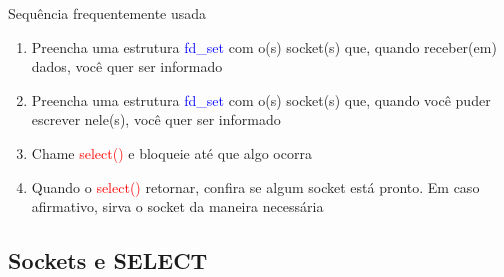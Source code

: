 \documentclass[10pt, xcolor=x11names]{beamer}
\begin{document}
\begin{frame} 

	\begin{block}{Sequência frequentemente usada}
	
		\begin{enumerate}[<+->]
			\item Preencha uma estrutura \textcolor{blue}{fd\_set} com o(s) socket(s) que, quando receber(em) dados, você quer ser informado
			\item Preencha uma estrutura \textcolor{blue}{fd\_set} com o(s) socket(s) que, quando você puder escrever nele(s), você quer ser informado
			\item Chame \textcolor{red}{select()} e bloqueie até que algo ocorra
			\item Quando o \textcolor{red}{select()} retornar, confira se algum socket está pronto. Em caso afirmativo, sirva o socket da maneira necessária
		\end{enumerate}

	\end{block}
	
\end{frame}

\subsection{Sockets e SELECT}
\end{document}
